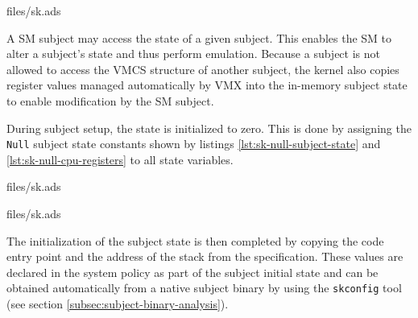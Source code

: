 
	{files/sk.ads}

A SM subject may access the state of a given subject. This enables
the SM to alter a subject's state and thus perform emulation. Because a subject
is not allowed to access the VMCS structure of another subject, the kernel also
copies register values managed automatically by VMX into the
in-memory subject state to enable modification by the SM subject.

During subject setup, the state is initialized to zero. This is done by
assigning the \texttt{Null} subject state constants shown by listings
\ref{lst:sk-null-subject-state} and \ref{lst:sk-null-cpu-registers} to all
state variables.


	{files/sk.ads}


	{files/sk.ads}

The initialization of the subject state is then completed by copying the code
entry point and the address of the stack from the specification.  These values
are declared in the system policy as part of the subject initial state and can
be obtained automatically from a native subject binary by using the
\texttt{skconfig} tool (see section \ref{subsec:subject-binary-analysis}).
